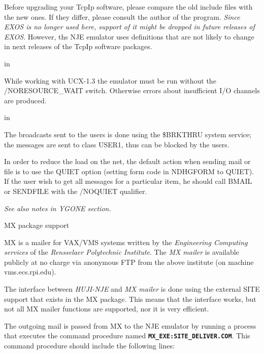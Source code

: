 {\ncrBold Before upgrading your TcpIp software}, please compare the old include
files with the new ones. If they differ, please consult  the  author  of
the  program.  {\sl Since EXOS is no longer used here, support of it might be
dropped in future releases of EXOS}.  However,  ths  NJE  emulator  uses
definitions  that are not likely to change in next releases of the TcpIp
software packages.

 in

While working with UCX-1.3 the  emulator  must  be  run  without  the
/NORESOURCE\_WAIT  switch. Otherwise errors about insufficient I/O channels
are produced.

 in

The broadcasts sent to the users is done using  the  \$BRKTHRU  system
service;  the  messages  are sent to class USER1, thus can be blocked by
the users.

In order to reduce the load on  the  net,  the  default  action  when
sending  mail  or  file is to use the QUIET option (setting form code in
NDHGFORM to QUIET).  If  the  user  wish  to  get  all  messages  for  a
particular  item,  he  should  call  BMAIL or SENDFILE with the /NOQUIET
qualifier.

{\sl See also notes in YGONE section.}

\vfill\eject

\centerline{\ncrBig MX package support}


{\ncrBold MX} is a mailer for VAX/VMS systems written by the {\sl Engineering
Computing services} of the {\sl Rensselaer Polytechnic Institute}. The {\sl MX
mailer} is available publicly at no charge via anonymous FTP from the above
institute (on machine {\ncrBold vms.ecs.rpi.edu}).

The interface between {\sl HUJI-NJE} and {\sl MX mailer } is done using the
external SITE support that exists in the MX package. This means that the
interface works, but not all MX mailer functions are supported, nor it is
very efficient.

The outgoing mail is passed from MX to the NJE emulator by running a process
that executes the command procedure named {\tt \bf MX\_EXE:SITE\_DELIVER.COM}.
This command procedure should include the following lines:


